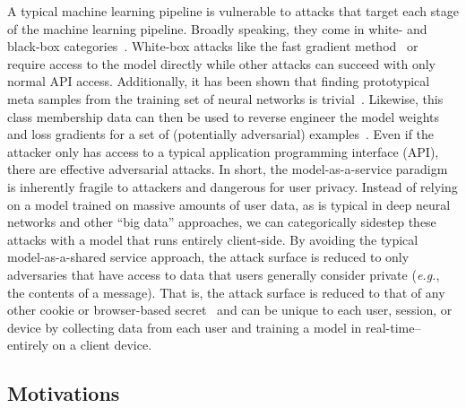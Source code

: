 \documentclass[conference]{IEEEtran}
\begin{document}
A typical machine learning pipeline is vulnerable to attacks that target each stage of the machine learning pipeline. Broadly speaking, they come in white- and black-box categories~\cite{meyers}. White-box attacks like the fast gradient method~\cite{fgm} or~\cite{deepfool} require access to the model directly while other attacks can succeed with only normal API access. 
Additionally, it has been shown that finding prototypical meta samples from the training set of neural networks is trivial~\cite{chakraborty_adversarial_2018}. 
Likewise, this class membership data can then be used to reverse engineer the model weights~\cite{deepfool} and loss gradients for a set of (potentially adversarial) examples~\cite{hopskipjump}. 
Even if the attacker only has access to a typical application programming interface (API), there are effective adversarial attacks\cite{hopskipjump}. 
In short, the model-as-a-service paradigm is inherently fragile to attackers and dangerous for user privacy. Instead of relying on a model trained on massive amounts of user data, as is typical in deep neural networks and other ``big data'' approaches, we can categorically sidestep these attacks with a model that runs entirely client-side. 
By avoiding the typical model-as-a-shared service approach, the attack surface is reduced to only adversaries that have access to data that users generally consider private (\textit{e.g.}, the contents of a message). 
That is, the attack surface is reduced to that of any other cookie or browser-based secret~\cite{} and can be unique to each user, session, or device by collecting data from each user and training a model in real-time-- entirely on a client device.



\subsection{Motivations} 
\end{document}
